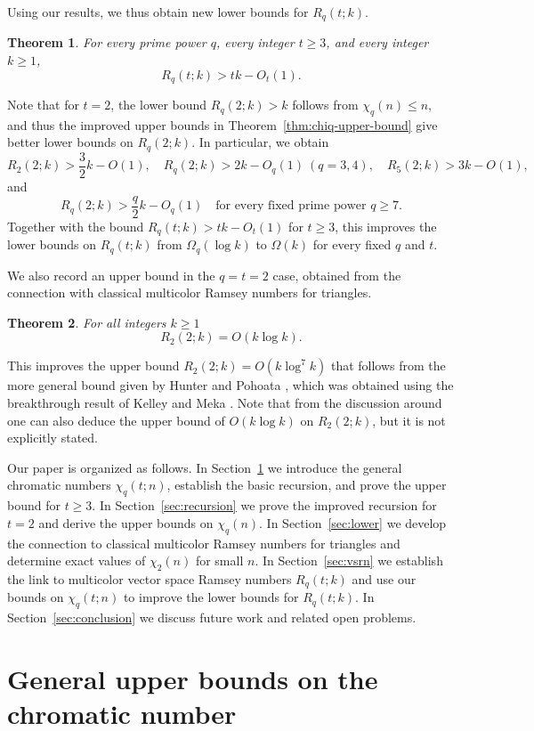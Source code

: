 \documentclass[11pt]{article}
\theoremstyle{plain}
\newtheorem{theorem}{Theorem}
\begin{document}
Using our results, we  thus obtain new lower bounds for $R_q(t;k)$.
\begin{theorem}\label{thm:Rqt-lower}
For every prime power $q$, every integer $t\ge3$, and every integer $k\ge1$,
\[
R_q(t;k)>tk-O_{t}(1).
\]
\end{theorem}

Note that for $t=2$, the lower bound $R_q(2;k)>k$ follows from $\chi_q(n)\le n$, and thus the improved upper bounds in Theorem~\ref{thm:chiq-upper-bound} give better lower bounds on $R_q(2;k)$. 
In particular, we obtain
\[
R_2(2;k)>\frac32 k-O(1),\quad
R_q(2;k)>2k-O_q(1)\ (q=3,4),\quad
R_5(2;k)>3k-O(1),
\]
and
\[
R_q(2;k)>\frac q2 k-O_q(1)
\quad\text{for every fixed prime power }q\ge7.
\]
Together with the bound $R_q(t;k)>tk-O_t(1)$ for $t\ge3$, this improves the lower bounds on $R_q(t;k)$ from $\Omega_q(\log k)$ to $\Omega(k)$ for every fixed $q$ and $t$.

We also record an upper bound in the $q=t=2$ case, obtained from the connection with classical multicolor Ramsey numbers for triangles.
\begin{theorem}\label{thm:R22k-upper}
For all integers $k\ge 1$
\[
 R_2(2;k)=O(k\log k).
\]
\end{theorem}

This improves the upper bound $R_2(2;k)=O(k\log^7 k)$ that follows from the more general bound given by Hunter and Pohoata \cite[Theorem 1.4]{Hunter2025}, which was obtained using the breakthrough result of Kelley and Meka \cite{KelleyMeka2023}.
Note that from the discussion around \cite[Theorem 4.1]{Hunter2025} one can also deduce the upper bound of $O(k \log k)$ on $R_2(2; k)$, but it is not explicitly stated.

Our paper is organized as follows.
In Section~\ref{sec:nonbinary} we introduce the general chromatic numbers $\chi_q(t;n)$, establish the basic recursion, and prove the upper bound for $t\ge3$.
In Section~\ref{sec:recursion} we prove the improved recursion for $t=2$ and derive the upper bounds on $\chi_q(n)$.
In Section~\ref{sec:lower} we develop the connection to classical multicolor Ramsey numbers for triangles and determine exact values of $\chi_2(n)$ for small $n$.
In Section~\ref{sec:vsrn} we establish the link to multicolor vector space Ramsey numbers $R_q(t;k)$ and use our bounds on $\chi_q(t;n)$ to improve the lower bounds for $R_q(t;k)$.
In Section~\ref{sec:conclusion} we discuss future work and related open problems.

\section{General upper bounds on the chromatic number}\label{sec:nonbinary}
\end{document}
